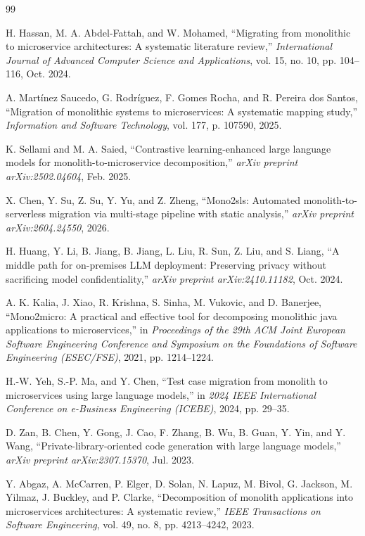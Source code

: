 \documentclass[conference]{IEEEtran}
\begin{document}
\begin{thebibliography}{99}

 H. Hassan, M. A. Abdel-Fattah, and W. Mohamed, ``Migrating from monolithic to microservice architectures: A systematic literature review,'' \textit{International Journal of Advanced Computer Science and Applications}, vol. 15, no. 10, pp. 104--116, Oct. 2024.

 A. Mart\'{i}nez Saucedo, G. Rodr\'{i}guez, F. Gomes Rocha, and R. Pereira dos Santos, ``Migration of monolithic systems to microservices: A systematic mapping study,'' \textit{Information and Software Technology}, vol. 177, p. 107590, 2025.

 K. Sellami and M. A. Saied, ``Contrastive learning-enhanced large language models for monolith-to-microservice decomposition,'' \textit{arXiv preprint arXiv:2502.04604}, Feb. 2025.

 X. Chen, Y. Su, Z. Su, Y. Yu, and Z. Zheng, ``Mono2sls: Automated monolith-to-serverless migration via multi-stage pipeline with static analysis,'' \textit{arXiv preprint arXiv:2604.24550}, 2026.

 H. Huang, Y. Li, B. Jiang, B. Jiang, L. Liu, R. Sun, Z. Liu, and S. Liang, ``A middle path for on-premises LLM deployment: Preserving privacy without sacrificing model confidentiality,'' \textit{arXiv preprint arXiv:2410.11182}, Oct. 2024.

 A. K. Kalia, J. Xiao, R. Krishna, S. Sinha, M. Vukovic, and D. Banerjee, ``Mono2micro: A practical and effective tool for decomposing monolithic java applications to microservices,'' in \textit{Proceedings of the 29th ACM Joint European Software Engineering Conference and Symposium on the Foundations of Software Engineering (ESEC/FSE)}, 2021, pp. 1214--1224.

 H.-W. Yeh, S.-P. Ma, and Y. Chen, ``Test case migration from monolith to microservices using large language models,'' in \textit{2024 IEEE International Conference on e-Business Engineering (ICEBE)}, 2024, pp. 29--35.

 D. Zan, B. Chen, Y. Gong, J. Cao, F. Zhang, B. Wu, B. Guan, Y. Yin, and Y. Wang, ``Private-library-oriented code generation with large language models,'' \textit{arXiv preprint arXiv:2307.15370}, Jul. 2023.

 Y. Abgaz, A. McCarren, P. Elger, D. Solan, N. Lapuz, M. Bivol, G. Jackson, M. Yilmaz, J. Buckley, and P. Clarke, ``Decomposition of monolith applications into microservices architectures: A systematic review,'' \textit{IEEE Transactions on Software Engineering}, vol. 49, no. 8, pp. 4213--4242, 2023.


\end{thebibliography}
\end{document}
